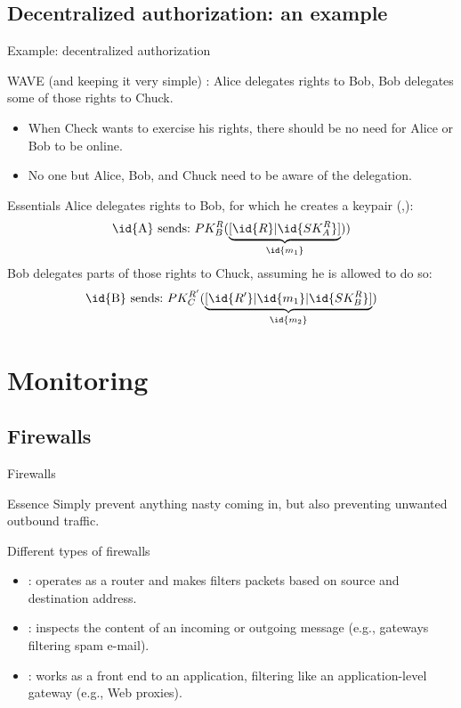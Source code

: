 \subsection{Decentralized authorization: an example}
\begin{slide}{Example: decentralized authorization}
  \begin{block}{WAVE (and keeping it very simple)}
    : Alice delegates rights to Bob, Bob delegates some of those rights to Chuck.
    \begin{itemize}
    \item When Check wants to exercise his rights, there should be no need for Alice or Bob to be online.
    \item No one but Alice, Bob, and Chuck need to be aware of the delegation.
    \end{itemize}
  \end{block}
  \begin{block}{Essentials}
    Alice delegates rights  to Bob, for which he creates a keypair (,):
    \[
    \mbox{\id{A} sends:\ } PK_{B}^{R}( \underbrace{[ \id{R} | \id{SK_A^{R}} ]}_{\id{m_1}}))
    \]
    Bob delegates parts of those rights  to Chuck, assuming he is allowed to do so:
    \[
    \mbox{\id{B} sends:\ } PK_{C}^{R^{\prime}}( \underbrace{[ \id{R^{\prime}} | \id{m_1} | \id{SK_B^{R}} ]}_{\id{m_2}})
    \]
  \end{block}
\end{slide}
\section{Monitoring}
\subsection{Firewalls}
\begin{slide}{Firewalls}
  \begin{block}{Essence}
    Simply prevent anything nasty coming in, but also preventing unwanted outbound traffic.
  \end{block}\vspace*{-6pt}
  \begin{centerfig}
  \end{centerfig}
  \begin{block}{Different types of firewalls}
    \vspace*{-6pt}
    \begin{itemize}\tightlist
    \item {}: operates as a router and makes filters packets based on source and
      destination address.
    \item {}: inspects the content of an incoming or outgoing message (e.g.,
      gateways filtering spam e-mail).
    \item {}: works as a front end to an application, filtering like an application-level
      gateway (e.g., Web proxies).
    \end{itemize}
  \end{block}
\end{slide}
